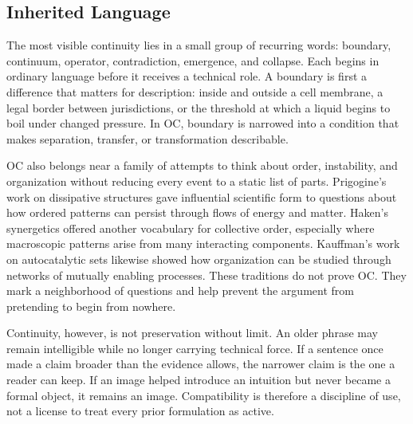 \documentclass[11pt,a4paper,openany]{book}
\begin{document}
\subsection{Inherited Language}
The most visible continuity lies in a small group of recurring words: boundary, continuum, operator, contradiction, emergence, and collapse. Each begins in ordinary language before it receives a technical role. A boundary is first a difference that matters for description: inside and outside a cell membrane, a legal border between jurisdictions, or the threshold at which a liquid begins to boil under changed pressure. In OC, boundary is narrowed into a condition that makes separation, transfer, or transformation describable. \cite{prigogine_dissipative,haken_synergetics}\par
OC also belongs near a family of attempts to think about order, instability, and organization without reducing every event to a static list of parts. Prigogine's work on dissipative structures gave influential scientific form to questions about how ordered patterns can persist through flows of energy and matter. Haken's synergetics offered another vocabulary for collective order, especially where macroscopic patterns arise from many interacting components. Kauffman's work on autocatalytic sets likewise showed how organization can be studied through networks of mutually enabling processes. These traditions do not prove OC. They mark a neighborhood of questions and help prevent the argument from pretending to begin from nowhere.\par
Continuity, however, is not preservation without limit. An older phrase may remain intelligible while no longer carrying technical force. If a sentence once made a claim broader than the evidence allows, the narrower claim is the one a reader can keep. If an image helped introduce an intuition but never became a formal object, it remains an image. Compatibility is therefore a discipline of use, not a license to treat every prior formulation as active.\par
\end{document}
